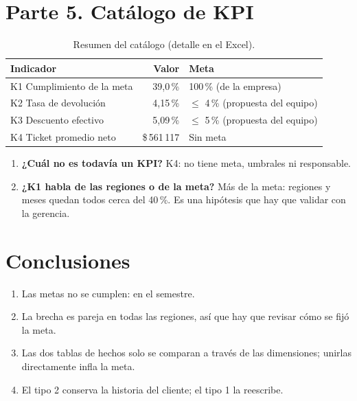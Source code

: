 \documentclass[11pt,letterpaper]{article}
\newcommand{\cop}[1]{\$\,#1}
\begin{document}
\section{Parte 5. Catálogo de KPI}

\begin{table}[!ht]
\centering\small
\caption{Resumen del catálogo (detalle en el Excel).}
\begin{tabular}{L{4.2cm}rL{4.4cm}}
\toprule
Indicador & Valor & Meta \\
\midrule
K1 Cumplimiento de la meta & 39,0\,\% & 100\,\% (de la empresa) \\
K2 Tasa de devolución & 4,15\,\% & $\le$ 4\,\% (propuesta del equipo) \\
K3 Descuento efectivo & 5,09\,\% & $\le$ 5\,\% (propuesta del equipo) \\
K4 Ticket promedio neto & \cop{561\,117} & Sin meta \\
\bottomrule
\end{tabular}
\end{table}

\begin{enumerate}
  \item \textbf{¿Cuál no es todavía un KPI?} K4: no tiene meta, umbrales ni responsable.
  \item \textbf{¿K1 habla de las regiones o de la meta?} Más de la meta: regiones y meses quedan todos cerca del
        40\,\%. Es una hipótesis que hay que validar con la gerencia.
\end{enumerate}

\section{Conclusiones}

\begin{enumerate}
  \item Las metas no se cumplen: \CumplTotal{} en el semestre.
  \item La brecha es pareja en todas las regiones, así que hay que revisar cómo se fijó la meta.
  \item Las dos tablas de hechos solo se comparan a través de las dimensiones; unirlas directamente infla la meta.
  \item El tipo 2 conserva la historia del cliente; el tipo 1 la reescribe.
\end{enumerate}
\end{document}
